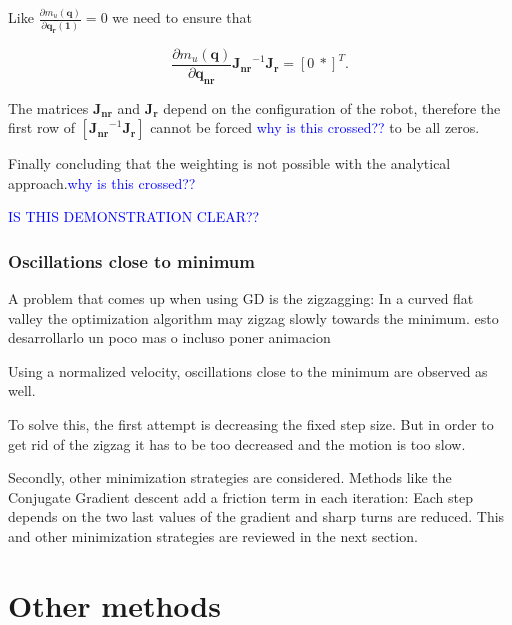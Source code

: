 Like $\frac{\partial {m_u(\mathbf{q})}}{\partial{\mathbf{q_{r}(1)}}} =0 $  we need to ensure that


\begin{equation}
\frac{\partial {m_u(\mathbf{q})}}{\partial{\mathbf{q_{nr}}}}\mathbf{J_{nr}}^{-1} \mathbf{J_{r}}= [0 \ 	  *]^{T}.
\end{equation} 

The matrices $\mathbf{J_{nr}}$ and $\mathbf{J_{r}}$ depend on the configuration of the robot, therefore the first row of  $[\mathbf{J_{nr}}^{-1} \mathbf{J_{r}}]$ cannot be forced \textcolor{blue}{why is this crossed?? } to be all zeros. 

Finally concluding that the weighting is not possible with the analytical approach.\textcolor{blue}{why is this crossed?? }

\textcolor{blue}{IS THIS DEMONSTRATION CLEAR?? }




\subsubsection{Oscillations close to minimum}
\label{subsubsec:zigzag}


A problem that comes up when using GD is the zigzagging: In a curved flat valley the optimization algorithm may zigzag slowly towards the minimum. {\color{red} esto desarrollarlo un poco mas o incluso poner animacion}

Using a normalized velocity, oscillations close to the minimum are observed as well. 


To solve this, the first attempt is decreasing the fixed step size. But in order to get rid of the zigzag it has to be too decreased and the motion is too slow.


Secondly, other minimization strategies are considered. Methods like the Conjugate Gradient descent add a friction term in each iteration: Each step depends on the two last values of the gradient and sharp turns are reduced. This and other minimization strategies are reviewed in the next section.






 


\section{Other methods}
\label{sec:othermethods}


